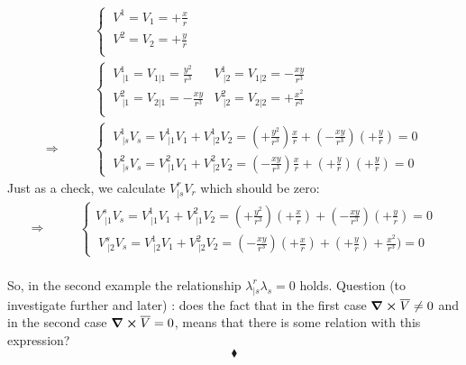 \begin{align}
\ & \left \{ \begin{array}{c}
\ V^1 = V_1 = +\frac{x}{r}\\
\ V^2 = V_2 = +\frac{y}{r}\\
\end{array}\right.\\
\ & \left \{ \begin{array}{cc}
\ V^1_{\ |1} =  V_{1|1} = \frac{y^2}{r^3}&V^1_{\ |2} =  V_{1|2} = -\frac{xy}{r^3}\\
\ V^2_{\ |1} =  V_{2|1} = -\frac{xy}{r^3}&V^2_{\ |2} =  V_{2|2} = +\frac{x^2}{r^3}\\
\end{array}\right.\\
\Rightarrow \quad\quad &\left \{ \begin{array}{c} \  V^1_{\ |s}V_s = V^1_{\ |1}V_1+V^1_{\ |2}V_2 = (+\frac{y^2}{r^3})\frac{x}{r}+ (-\frac{xy}{r^3})(+\frac{y}{r}) =  0\\
\ V^2_{\ |s}V_s = V^2_{\ |1}V_1+V^2_{\ |2}V_2 = (-\frac{xy}{r^3})\frac{x}{r}+ (+\frac{y}{r})(+\frac{y}{r}) =  0
\end{array} \right.
\end{align}
Just as a check, we calculate $V^r_{|s}V_r$ which should be zero:
\begin{align}
\Rightarrow \quad\quad &\left \{ \begin{array}{c}V^s_{\ |1}V_s = V^1_{\ |1}V_1+V^2_{\ |1}V_2 = (+\frac{y^2}{r^3})(+\frac{x}{r})+ (-\frac{xy}{r^3})(+\frac{y}{r}) =0\\
\ V^s_{\ |2}V_s = V^1_{\ |2}V_1+V^2_{\ |2}V_2 = (-\frac{xy}{r^3})(+\frac{x}{r})+ (+\frac{y}{r})+\frac{x^2}{r^3}) = 0
\end{array} \right.
\end{align}\\
So, in the second example the relationship $\lambda^r_{|s}\lambda_s = 0$ holds.
Question (to investigate further and later) : does the fact that in the first case $\grad \boldsymbol{\times} \overline{V}  \ne 0$ and in the second case $\grad \boldsymbol{\times} \overline{V}= 0$, means that there is some relation with this expression?
$$\blacklozenge$$
\newpage

